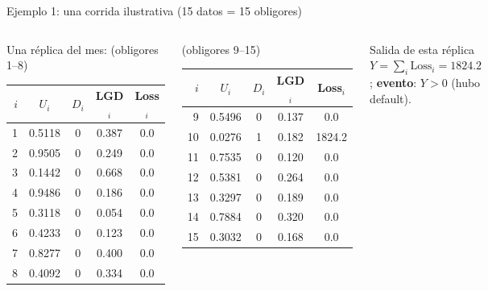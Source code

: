 \documentclass[aspectratio=1610, 9pt]{beamer}
\begin{document}
\begin{frame}{Ejemplo 1: una corrida ilustrativa (15 datos = 15 obligores)}
\scriptsize
\begin{columns}[T]
\begin{block}{Una réplica del mes: (obligores 1--8)}
\centering
\setlength{\tabcolsep}{4pt}
\begin{tabular}{@{}rcccc@{}}
\toprule
$i$ & $U_i$ & $D_i$ & LGD$_i$ & Loss$_i$ \\
\midrule
1 & 0.5118 & 0 & 0.387 & 0.0 \\
2 & 0.9505 & 0 & 0.249 & 0.0 \\
3 & 0.1442 & 0 & 0.668 & 0.0 \\
4 & 0.9486 & 0 & 0.186 & 0.0 \\
5 & 0.3118 & 0 & 0.054 & 0.0 \\
6 & 0.4233 & 0 & 0.123 & 0.0 \\
7 & 0.8277 & 0 & 0.400 & 0.0 \\
8 & 0.4092 & 0 & 0.334 & 0.0 \\
\bottomrule
\end{tabular}
\end{block}

\begin{block}{(obligores 9--15)}
\centering
\setlength{\tabcolsep}{4pt}
\begin{tabular}{@{}rcccc@{}}
\toprule
$i$ & $U_i$ & $D_i$ & LGD$_i$ & Loss$_i$ \\
\midrule
9 & 0.5496 & 0 & 0.137 & 0.0 \\
10 & 0.0276 & 1 & 0.182 & 1824.2 \\
11 & 0.7535 & 0 & 0.120 & 0.0 \\
12 & 0.5381 & 0 & 0.264 & 0.0 \\
13 & 0.3297 & 0 & 0.189 & 0.0 \\
14 & 0.7884 & 0 & 0.320 & 0.0 \\
15 & 0.3032 & 0 & 0.168 & 0.0 \\
\bottomrule
\end{tabular}
\end{block}

\begin{alertblock}{Salida de esta réplica}
$Y=\sum_i \text{Loss}_i = 1824.2$;\quad
\textbf{evento}: $Y>0$ (hubo default).
\end{alertblock}
\end{columns}
\end{frame}
\end{document}
